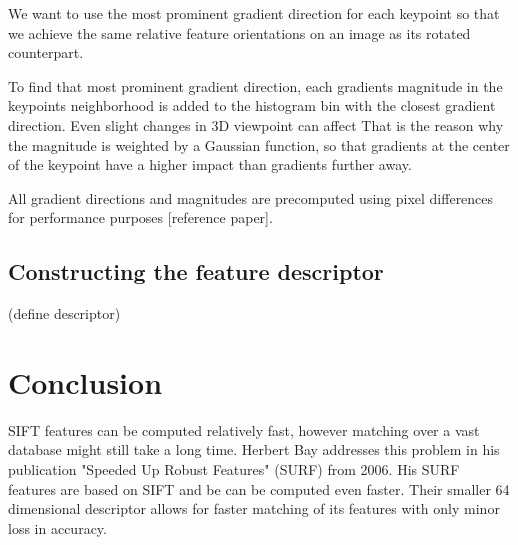 \documentclass{article}
\begin{document}
	We want to use the most prominent gradient direction for each keypoint so that we achieve the same relative feature orientations on an image as its rotated counterpart.
	
	To find that most prominent gradient direction, each gradients magnitude in the keypoints neighborhood is added to the histogram bin with the closest gradient direction. Even slight changes in 3D viewpoint can affect 
	That is the reason why the magnitude is weighted by a Gaussian function, so that gradients at the center of the keypoint have a higher impact than gradients further away.
	
	All gradient directions and magnitudes are precomputed using pixel differences for performance purposes [reference paper].
	
	
	\subsection{Constructing the feature descriptor}
	
	(define descriptor)
	
	\section{Conclusion}
	
	SIFT features can be computed relatively fast, however matching over a vast database might still take a long time. Herbert Bay addresses this problem in his publication "Speeded Up Robust Features" (SURF) from 2006. His SURF features are based on SIFT and be can be computed even faster. Their smaller 64 dimensional descriptor allows for faster matching of its features with only minor loss in accuracy.
\end{document}
